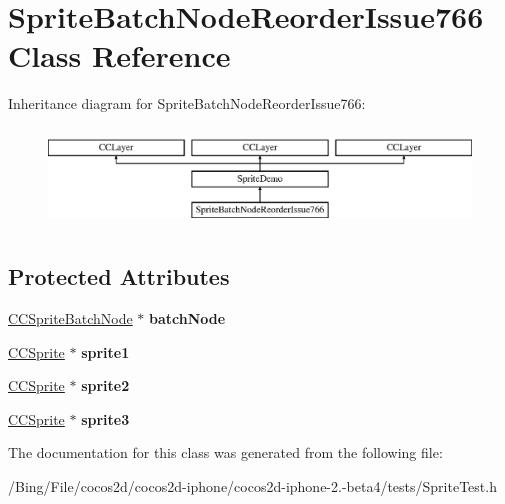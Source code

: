 \hypertarget{interface_sprite_batch_node_reorder_issue766}{\section{Sprite\-Batch\-Node\-Reorder\-Issue766 Class Reference}
\label{interface_sprite_batch_node_reorder_issue766}
}
Inheritance diagram for Sprite\-Batch\-Node\-Reorder\-Issue766\-:\begin{figure}[H]
\begin{center}
\leavevmode
\includegraphics[height=2.654028cm]{interface_sprite_batch_node_reorder_issue766}
\end{center}
\end{figure}
\subsection*{Protected Attributes}
\begin{DoxyCompactItemize}
\item 
\hypertarget{interface_sprite_batch_node_reorder_issue766_a4563f9c0ea5b507a6b050ddf1e1df383}{\hyperlink{interface_c_c_sprite_batch_node}{C\-C\-Sprite\-Batch\-Node} $\ast$ {\bfseries batch\-Node}}\label{interface_sprite_batch_node_reorder_issue766_a4563f9c0ea5b507a6b050ddf1e1df383}

\item 
\hypertarget{interface_sprite_batch_node_reorder_issue766_a3b373bd18812f10f2d9723f077b832ff}{\hyperlink{class_c_c_sprite}{C\-C\-Sprite} $\ast$ {\bfseries sprite1}}\label{interface_sprite_batch_node_reorder_issue766_a3b373bd18812f10f2d9723f077b832ff}

\item 
\hypertarget{interface_sprite_batch_node_reorder_issue766_aec6beb3959b56785bdb1aa81823f2575}{\hyperlink{class_c_c_sprite}{C\-C\-Sprite} $\ast$ {\bfseries sprite2}}\label{interface_sprite_batch_node_reorder_issue766_aec6beb3959b56785bdb1aa81823f2575}

\item 
\hypertarget{interface_sprite_batch_node_reorder_issue766_a3917da69156c2f00b1c12e0293663018}{\hyperlink{class_c_c_sprite}{C\-C\-Sprite} $\ast$ {\bfseries sprite3}}\label{interface_sprite_batch_node_reorder_issue766_a3917da69156c2f00b1c12e0293663018}

\end{DoxyCompactItemize}


The documentation for this class was generated from the following file\-:\begin{DoxyCompactItemize}
\item 
/\-Bing/\-File/cocos2d/cocos2d-\/iphone/cocos2d-\/iphone-\/2.-\/beta4/tests/Sprite\-Test.\-h\end{DoxyCompactItemize}

